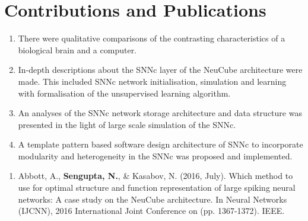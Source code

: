 \pagebreak
\section{Contributions and Publications}
\begin{tcolorbox}[colback=black!5,colframe=black!40!black,title=Contributions]
	\itshape
	\begin{enumerate}
		\item There were qualitative comparisons of the contrasting characteristics of a biological brain and a computer.
		\item In-depth descriptions about the SNNc layer of the NeuCube architecture were made. This included SNNc network initialisation, simulation and learning with formalisation of the unsupervised learning algorithm.
		\item An analyses of the SNNc network storage architecture and data structure was presented in the light of large scale simulation of the SNNc.
		\item A template pattern based software design architecture of SNNc to incorporate modularity and heterogeneity in the SNNc was proposed and implemented.   
	\end{enumerate}

\end{tcolorbox}

\begin{tcolorbox}[colback=black!5,colframe=black!40!black,title=Publications]
	\begin{enumerate}
		\item Abbott, A., \textbf{Sengupta, N.}, \& Kasabov, N. (2016, July). Which method to use for optimal structure and function representation of large spiking neural networks: A case study on the NeuCube architecture. In Neural Networks (IJCNN), 2016 International Joint Conference on (pp. 1367-1372). IEEE.
	\end{enumerate}
\end{tcolorbox}



